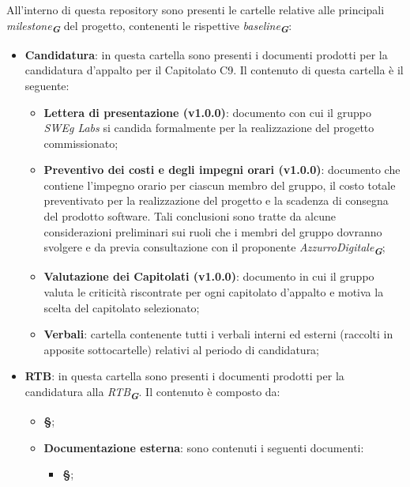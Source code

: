 \label{sec:repo_documentazione}
All’interno di questa repository sono presenti le cartelle relative alle principali \emph{milestone}\textsubscript{\textit{\textbf{G}}}
del progetto, contenenti le rispettive \emph{baseline}\textsubscript{\textit{\textbf{G}}}:
\begin{itemize}
    \item \textbf{Candidatura}:  in questa cartella sono presenti i documenti prodotti per la candidatura
    d’appalto per il Capitolato C9. Il contenuto di questa cartella è il seguente:
    \begin{itemize}
        \item \textbf{Lettera di presentazione (v1.0.0)}: documento con cui il gruppo \emph{SWEg Labs} si
        candida formalmente per la realizzazione del progetto commissionato;
        \item \textbf{Preventivo dei costi e degli impegni orari (v1.0.0)}: documento che contiene 
        l’impegno orario per ciascun membro del gruppo, il costo totale preventivato per la
        realizzazione del progetto e la scadenza di consegna del prodotto software. Tali
        conclusioni sono tratte da alcune considerazioni preliminari sui ruoli che i membri
        del gruppo dovranno svolgere e da previa consultazione con il proponente \emph{AzzurroDigitale}\textsubscript{\textit{\textbf{G}}};
        \item \textbf{Valutazione dei Capitolati (v1.0.0)}: documento in cui il gruppo valuta 
        le criticità riscontrate per ogni capitolato d’appalto e motiva la scelta del
        capitolato selezionato;
        \item \textbf{Verbali}: cartella contenente tutti i verbali interni ed esterni (raccolti in apposite sottocartelle)
        relativi al periodo di candidatura;
    \end{itemize}
    \item \textbf{RTB}: in questa cartella sono presenti i documenti prodotti per la candidatura alla \emph{RTB}\textsubscript{\textit{\textbf{G}}}.
    Il contenuto è composto da:
    \begin{itemize}
        \item \textbf{\S{}};
        \item \textbf{Documentazione esterna}: sono contenuti i seguenti documenti:
        \begin{itemize}
            \item \textbf{\S{}};

\end{itemize}
\end{itemize}
\end{itemize}
